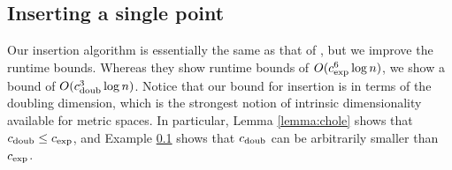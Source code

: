 \documentclass[thesis.tex]{subfiles}
\makeatletter
\newcommand{\dist}[2]{\distf({#1},{#2})}
\newcommand{\distf}{d}
\newcommand{\cexp}{c_\textnormal{exp}}
\newcommand{\cdoub}{c_\textnormal{doub}}
\newcommand{\eann}{(1+\varepsilon)\text{-ann}}
\newcommand{\q}{\ensuremath q}
\newcommand{\mkfunction}[1]{\ifmmode{\textnormal{{#1}}}}
\newcommand{\maxdist}[1]    {\mkfunction{maxdist}({#1})}
\newcommand{\data}[1]       {\mkfunction{data}({#1})}
\newcommand{\nn}[1]         {\mkfunction{nn}[{#1}]}
\def\nn{\@ifstar\@nn\@@nn}
\def\@nn#1{\mkfunction{nn}^*[{#1}]}
\def\@@nn#1{\mkfunction{nn}[{#1}]}
\newcommand{\mkprocedure}[1]{\textnormal{\ttfamily {#1}}}
\newcommand{\findnn}{\mkprocedure{findnn}}
\makeatother
\begin{document}



\subsection{Inserting a single point}

Our insertion algorithm is essentially the same as that of \citet{beygelzimer2006cover},
but we improve the runtime bounds.
Whereas they show runtime bounds of $O(\cexp^6\log n)$,
we show a bound of $O(\cdoub^3\log n)$.
Notice that our bound for insertion is in terms of the doubling dimension,
which is the strongest notion of intrinsic dimensionality available for metric spaces.
In particular, Lemma \ref{lemma:chole} shows that $\cdoub \le \cexp$,
and Example \ref{} shows that $\cdoub$ can be arbitrarily smaller than $\cexp$.
\end{document}
